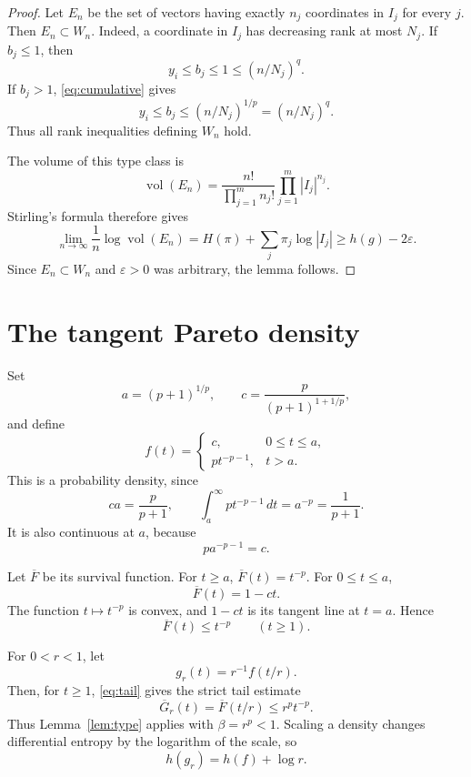\documentclass[11pt]{article}
\newcommand{\vol}{\operatorname{vol}}
\newcommand{\1}{\mathbf 1}
\begin{document}
\begin{proof}
Let \(E_n\) be the set of vectors having exactly \(n_j\) coordinates in
\(I_j\) for every \(j\).  Then \(E_n\subset W_n\).  Indeed, a coordinate
in \(I_j\) has decreasing rank at most \(N_j\).  If \(b_j\leq1\), then
\[
 y_i\leq b_j\leq1\leq(n/N_j)^q.
\]
If \(b_j>1\), \eqref{eq:cumulative} gives
\[
 y_i\leq b_j\leq(n/N_j)^{1/p}=(n/N_j)^q.
\]
Thus all rank inequalities defining \(W_n\) hold.

The volume of this type class is
\[
 \vol(E_n)=
 \frac{n!}{\prod_{j=1}^m n_j!}
 \prod_{j=1}^m |I_j|^{n_j}.
\]
Stirling's formula therefore gives
\[
 \lim_{n\to\infty}\frac1n\log\vol(E_n)
 =H(\pi)+\sum_j\pi_j\log|I_j|
 \geq h(g)-2\varepsilon.
\]
Since \(E_n\subset W_n\) and \(\varepsilon>0\) was arbitrary, the lemma
follows.
\end{proof}

\section{The tangent Pareto density}

Set
\[
 a=(p+1)^{1/p},\qquad
 c=\frac{p}{(p+1)^{1+1/p}},
\]
and define
\begin{equation}\label{eq:density}
 f(t)=
 \begin{cases}
 c,&0\leq t\leq a,\\
 pt^{-p-1},&t>a.
 \end{cases}
\end{equation}
This is a probability density, since
\[
 ca=\frac{p}{p+1},\qquad
 \int_a^\infty pt^{-p-1}\,dt=a^{-p}=\frac1{p+1}.
\]
It is also continuous at \(a\), because
\[
 pa^{-p-1}=c.
\]

Let \(\overline F\) be its survival function.  For \(t\geq a\),
\(\overline F(t)=t^{-p}\).  For \(0\leq t\leq a\),
\[
 \overline F(t)=1-ct.
\]
The function \(t\mapsto t^{-p}\) is convex, and \(1-ct\) is its tangent
line at \(t=a\).  Hence
\begin{equation}\label{eq:tail}
 \overline F(t)\leq t^{-p}\qquad(t\geq1).
\end{equation}

For \(0<r<1\), let
\[
 g_r(t)=r^{-1}f(t/r).
\]
Then, for \(t\geq1\), \eqref{eq:tail} gives the strict tail estimate
\begin{equation}\label{eq:strict}
 \overline G_r(t)=\overline F(t/r)
 \leq r^pt^{-p}.
\end{equation}
Thus Lemma~\ref{lem:type} applies with \(\beta=r^p<1\).  Scaling a
density changes differential entropy by the logarithm of the scale, so
\begin{equation}\label{eq:scaledentropy}
 h(g_r)=h(f)+\log r.
\end{equation}
\end{document}
